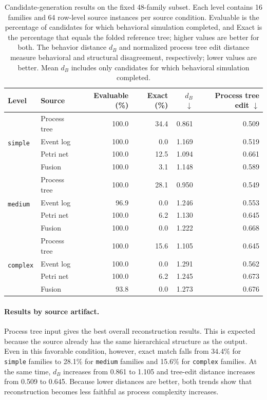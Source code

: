 \documentclass[mathematics,article,submit,moreauthors]{Definitions/mdpi}
\begin{document}
\begin{table}[!b]
\centering
\caption{Candidate-generation results on the fixed 48-family subset. Each level contains 16 families and 64 row-level source instances per source condition. Evaluable is the percentage of candidates for which behavioral simulation completed, and Exact is the percentage that equals the folded reference tree; higher values are better for both. The behavior distance $d_B$ and normalized process tree edit distance measure behavioral and structural disagreement, respectively; lower values are better. Mean $d_B$ includes only candidates for which behavioral simulation completed.}
\label{tab:decode}
\begin{tabular}{@{}llrrrr@{}}
\toprule
Level & Source & Evaluable (\%) & Exact (\%) & $d_B$ $\downarrow$ & Process tree edit $\downarrow$ \\
\midrule
\multirow{4}{*}{\texttt{simple}}
 & Process tree & 100.0 & 34.4 & 0.861 & 0.509 \\
 & Event log    & 100.0 & 0.0  & 1.169 & 0.519 \\
 & Petri net    & 100.0 & 12.5 & 1.094 & 0.661 \\
 & Fusion       & 100.0 & 3.1  & 1.148 & 0.589 \\
\midrule
\multirow{4}{*}{\texttt{medium}}
 & Process tree & 100.0 & 28.1 & 0.950 & 0.549 \\
 & Event log    & 96.9  & 0.0  & 1.246 & 0.553 \\
 & Petri net    & 100.0 & 6.2  & 1.130 & 0.645 \\
 & Fusion       & 100.0 & 0.0  & 1.222 & 0.668 \\
\midrule
\multirow{4}{*}{\texttt{complex}}
 & Process tree & 100.0 & 15.6 & 1.105 & 0.645 \\
 & Event log    & 100.0 & 0.0  & 1.291 & 0.562 \\
 & Petri net    & 100.0 & 6.2  & 1.245 & 0.673 \\
 & Fusion       & 93.8  & 0.0  & 1.273 & 0.676 \\
\bottomrule
\end{tabular}
\end{table}

\paragraph{Results by source artifact.}
Process tree input gives the best overall reconstruction results. This is expected because the source already has the same hierarchical structure as the output. Even in this favorable condition, however, exact match falls from 34.4\% for \texttt{simple} families to 28.1\% for \texttt{medium} families and 15.6\% for \texttt{complex} families. At the same time, $d_B$ increases from 0.861 to 1.105 and tree-edit distance increases from 0.509 to 0.645. Because lower distances are better, both trends show that reconstruction becomes less faithful as process complexity increases.
\end{document}
